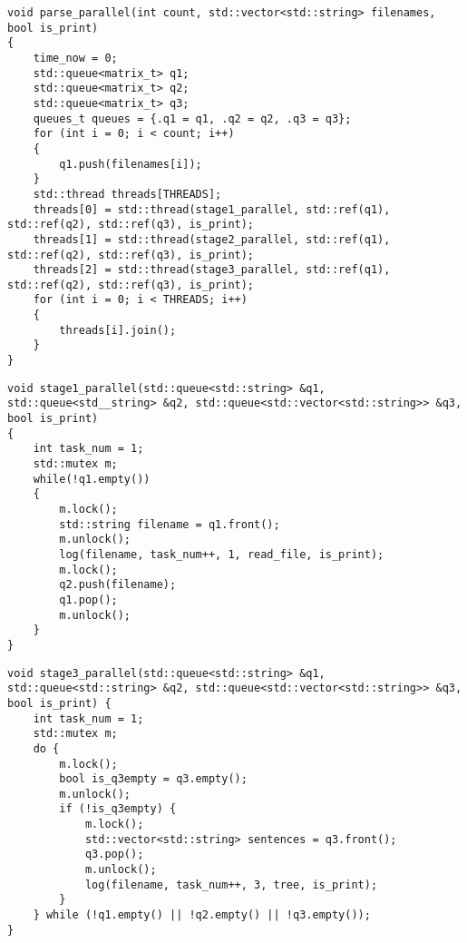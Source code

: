 \clearpage

\begin{center}
    \captionsetup{justification=raggedright,singlelinecheck=off}
    \begin{lstlisting}[label=lst:par_alg,caption=Алгоритм конвейерной обработки текста]
void parse_parallel(int count, std::vector<std::string> filenames, bool is_print)
{
	time_now = 0;
	std::queue<matrix_t> q1;
	std::queue<matrix_t> q2;
	std::queue<matrix_t> q3;
	queues_t queues = {.q1 = q1, .q2 = q2, .q3 = q3};
	for (int i = 0; i < count; i++)
	{
		q1.push(filenames[i]);
	}
	std::thread threads[THREADS];
	threads[0] = std::thread(stage1_parallel, std::ref(q1), std::ref(q2), std::ref(q3), is_print);
	threads[1] = std::thread(stage2_parallel, std::ref(q1), std::ref(q2), std::ref(q3), is_print);
	threads[2] = std::thread(stage3_parallel, std::ref(q1), std::ref(q2), std::ref(q3), is_print);
	for (int i = 0; i < THREADS; i++)
	{
		threads[i].join();
	}
}
\end{lstlisting}
\end{center}


\clearpage


\begin{center}
    \captionsetup{justification=raggedright,singlelinecheck=off}
    \begin{lstlisting}[label=lst:1,caption=Алгоритм запуска 1 потока для чтения текста из файла]
void stage1_parallel(std::queue<std::string> &q1, std::queue<std__string> &q2, std::queue<std::vector<std::string>> &q3, bool is_print)
{
	int task_num = 1;
	std::mutex m;
	while(!q1.empty())
	{      
		m.lock();
		std::string filename = q1.front();
		m.unlock();
		log(filename, task_num++, 1, read_file, is_print);
		m.lock();
		q2.push(filename);
		q1.pop();
		m.unlock();
	}
}
\end{lstlisting}
\end{center}
\begin{center}
	\captionsetup{justification=raggedright,singlelinecheck=off}
	\begin{lstlisting}[label=lst:3,caption=Алгоритм запуска 3 потока для построения деревьев синтаксических зависимостей]
void stage3_parallel(std::queue<std::string> &q1, std::queue<std::string> &q2, std::queue<std::vector<std::string>> &q3, bool is_print) {
	int task_num = 1;
	std::mutex m;
	do { 
		m.lock();
		bool is_q3empty = q3.empty();
		m.unlock();
		if (!is_q3empty) {
			m.lock();
			std::vector<std::string> sentences = q3.front(); 
			q3.pop();
			m.unlock();
			log(filename, task_num++, 3, tree, is_print);
		}
	} while (!q1.empty() || !q2.empty() || !q3.empty());
}
	\end{lstlisting}
\end{center}

